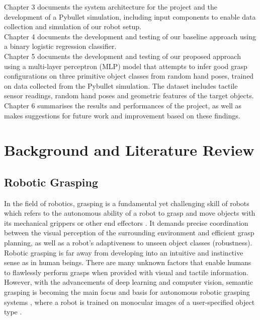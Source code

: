 \documentclass[11pt, a4paper]{report}
\begin{document}
Chapter 3 documents the system architecture for the project and the development of a Pybullet simulation, including input components to enable data collection and simulation of our robot setup.\\

Chapter 4 documents the development and testing of our baseline approach using a binary logistic regression classifier.\\

Chapter 5 documents the development and testing of our proposed approach using a multi-layer perceptron (MLP) model that attempts to infer good grasp configurations on three primitive object classes from random hand poses, trained on data collected from the Pybullet simulation. The dataset includes tactile sensor readings, random hand poses and geometric features of the target objects.\\

Chapter 6 summarises the results and performances of the project, as well as makes suggestions for future work and improvement based on these findings.



\chapter{Background and Literature Review}
\label{chap:2}


\section{Robotic Grasping}
\label{sec:2.1}
In the field of robotics, grasping is a fundamental yet challenging skill of robots which refers to the autonomous ability of a robot to grasp and move objects with its mechanical grippers or other end effectors \cite{zhang2022robotic}. It demands precise coordination between the visual perception of the surrounding environment and efficient grasp planning, as well as a robot's adaptiveness to unseen object classes (robustness).\\

Robotic grasping is far away from developing into an intuitive and instinctive sense as in human beings. There are many unknown factors that enable humans to flawlessly perform grasps when provided with visual and tactile information. However, with the advancements of deep learning and computer vision, semantic grasping is becoming the main focus and basis for autonomous robotic grasping systems \cite{zhang2022robotic}, where a robot is trained on monocular images of a user-specified object type \cite{jang2017endtoend}.\\
\end{document}
